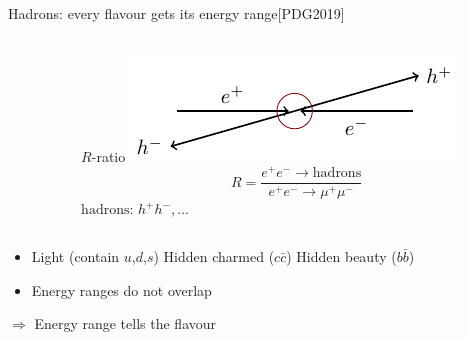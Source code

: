 \documentclass[aspectratio=169]{beamer}
\newcommand{\paper}[1]{{\scriptsize[#1]}}
\begin{document}
\begin{frame}{Hadrons: every flavour gets its energy range\hfill\paper{PDG2019}}
    \vspace{3mm}
    \begin{columns}
        \begin{column}{0.7\textwidth}
        \end{column}
        \begin{column}{0.29\textwidth}
            \vspace{-3mm}
            \begin{block}{$R$-ratio}
                \!\!\includegraphics[width=\textwidth]{inline-figs/collision_ee.pdf}
                $$R = \frac{e^+e^-\to\textrm{hadrons}}{e^+e^-\to\mu^+\mu^-}$$
                $\textrm{hadrons}:\,h^+h^-,\dots$
            \end{block}
        \end{column}
    \end{columns}\pause
    \vspace{-2mm}
    \begin{itemize}
        \item {\color{cola} Light (contain $u$,$d$,$s$)}\quad
        {\color{colb} Hidden charmed ($c\bar{c}$)}\quad
        {\color{colc} Hidden beauty ($b\bar{b}$)}\pause
        \item Energy ranges do not overlap
    \end{itemize}
    \vspace{-2mm}
    \begin{exampleblock}{}
        $\Rightarrow$ Energy range tells the flavour
    \end{exampleblock}
\end{frame}
\end{document}
